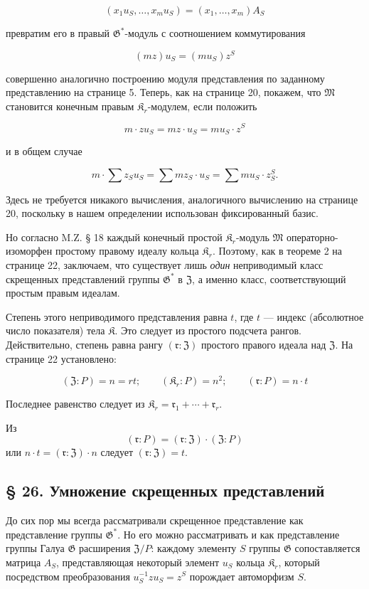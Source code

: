 \documentclass[11pt]{article}
\begin{document}
\[(x_1u_S,\ldots,x_mu_S)=(x_1,\ldots,x_m)A_S\]

превратим его в правый \(\mathfrak G^*\)-модуль с соотношением коммутирования

\[(mz) u_S = (mu_S) z^S\]

совершенно аналогично построению модуля представления по заданному представлению на странице 5. Теперь, как на странице 20, покажем, что \(\mathfrak{M}\) становится конечным правым \(\mathfrak K_r\)-модулем, если положить

\[m \cdot z u_S = mz \cdot u_S = mu_S \cdot z^S\]

и в общем случае

\[m \cdot \sum z_S u_S = \sum m z_S \cdot u_S = \sum m u_S \cdot z_S^S.\]

Здесь не требуется никакого вычисления, аналогичного вычислению на странице 20, поскольку в нашем определении использован фиксированный базис.

Но согласно M.Z. § 18 каждый конечный простой \(\mathfrak K_r\)-модуль \(\mathfrak{M}\) операторно-изоморфен простому правому идеалу кольца \(\mathfrak K_r\). Поэтому, как в теореме 2 на странице 22, заключаем, что существует лишь \emph{один} неприводимый класс скрещенных представлений группы \(\mathfrak{G}^*\) в \(\mathfrak Z\), а именно класс, соответствующий простым правым идеалам.

Степень этого неприводимого представления равна \(t\), где \(t\) --- индекс (абсолютное число показателя) тела \(\mathfrak K\). Это следует из простого подсчета рангов. Действительно, степень равна рангу \((\mathfrak r:\mathfrak Z)\) простого правого идеала над \(\mathfrak Z\). На странице 22 установлено:

\[
(\mathfrak Z:P)=n=rt;\qquad (\mathfrak K_r:P)=n^2;\qquad (\mathfrak r:P)=n\cdot t
\]

Последнее равенство следует из \(\mathfrak K_r = \mathfrak{r}_1 + \cdots + \mathfrak{r}_r\).

Из
\[(\mathfrak{r}: P) = (\mathfrak{r}: \mathfrak Z) \cdot (\mathfrak Z: P)\]
или \(n \cdot t = (\mathfrak{r}: \mathfrak Z) \cdot n\) следует \((\mathfrak{r}: \mathfrak Z) = t\).

\subsection*{§ 26. Умножение скрещенных представлений}\label{multiplikation-der-verschraenkten-darstellungen}

До сих пор мы всегда рассматривали скрещенное представление как представление группы \(\mathfrak{G}^*\). Но его можно рассматривать и как представление группы Галуа \(\mathfrak{G}\) расширения \(\mathfrak Z/P\): каждому элементу \(S\) группы \(\mathfrak{G}\) сопоставляется матрица \(A_S\), представляющая некоторый элемент \(u_S\) кольца \(\mathfrak K_r\), который посредством преобразования \(u_S^{-1}zu_S=z^S\) порождает автоморфизм \(S\).
\end{document}
